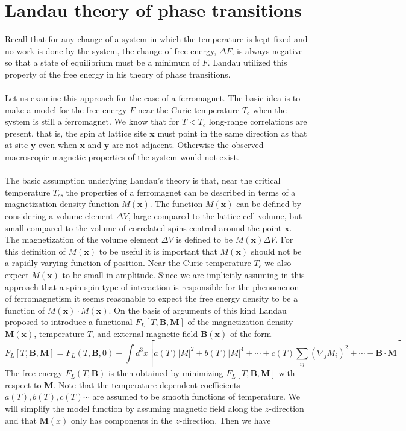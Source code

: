 \section{Landau theory of phase transitions}
Recall that for any change of a system in which the temperature is kept fixed and no work is done by the system, the change of free energy, $\Delta F$, is always negative so that a state of equilibrium must be a minimum of $F$. Landau utilized this property of the free energy in his theory of phase transitions.
\\ \\
Let us examine this approach for the case of a ferromagnet. The basic idea is to make a model for the free energy $F$ near the Curie temperature $T_c$ when the system is still a ferromagnet. We know that for $T < T_c$ long-range correlations are present, that is, the spin at lattice site $\bm{x}$ must point in the same direction as that at site $\bm{y}$ even when $\bm{x}$ and $\bm{y}$ are not adjacent. Otherwise the observed macroscopic magnetic properties of the system would not exist.
\\ \\
The basic assumption underlying Landau's theory is that, near the critical temperature $T_c$, the properties of a ferromagnet can be described in terms of a magnetization density function $M(\bm{x})$. 
The function $M(\bm{x})$ can be defined by considering a volume element $\Delta V$, large compared to the lattice cell volume, but small compared to the volume of correlated spins centred around the point $\bm{x}$. 
The magnetization of the volume element $\Delta V$ is defined to be $M(\bm{x}) \Delta V$. For this definition of $M(\bm{x})$ to be useful it is important that $M(\bm{x})$ should not be a rapidly varying function of position. Near the Curie temperature $T_c$ we also expect $M(\bm{x})$ to be small in amplitude. 
Since we are implicitly assuming in this approach that a spin-spin type of interaction is responsible for the phenomenon of ferromagnetism it seems reasonable to expect the free energy density to be a function of $M(\bm{x})\cdot M(\bm{x})$. On the basis of arguments of this kind Landau proposed to introduce a functional $F_L[T,\bm{B},\bm{M}]$ of the magnetization density $\bm{M}(\bm{x})$, temperature $T$, and external magnetic field $\bm{B}(\bm{x})$ of the form
\[F_L[T,\bm{B},\bm{M}] = F_L(T,\bm{B},0) + \int d^3x \left[ a(T)|M|^2 + b(T)|M|^4 + \cdots + c(T)\sum_{ij} (\nabla_jM_i)^2 + \cdots - \bm{B}\cdot\bm{M} \right]\]
The free energy $F_L(T,\bm{B})$ is then obtained by minimizing $F_L[T,\bm{B},\bm{M}]$ with respect to $\bm{M}$. Note that the temperature dependent coefficients $a(T), b(T), c(T) \cdots$ are assumed to be smooth functions of temperature. We will simplify the model function by assuming  magnetic field along the $z$-direction and that $\bm{M}(x)$ only has components in the $z$-direction. Then we have
